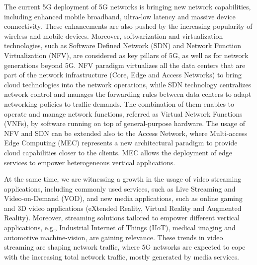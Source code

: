 




\begin{abstracts}        %
The current 5G deployment of 5G networks is bringing new network capabilities, including enhanced mobile broadband, ultra-low latency and massive device connectivity. These enhancements are also pushed by the increasing popularity of wireless and mobile devices. Moreover, softwarization and virtualization technologies, such as Software Defined Network (SDN) and Network Function Virtualization (NFV), are considered as key pillars of 5G, as well as for network generations beyond 5G.
NFV paradigm virtualizes all the data centers that are part of the network infrastructure (Core, Edge and Access Networks) to bring cloud technologies into the network operations,
while SDN technology centralizes network control and manages the forwarding rules between data centers to adapt networking policies to traffic demands.
The combination of them enables to operate and manage network functions, referred as Virtual Network Functions (VNFs), by software running on top of general-purpose hardware. The usage of NFV and SDN can be extended also to the Access Network, where Multi-access Edge Computing (MEC) represents a new architectural paradigm to provide cloud capabilities closer to the clients. MEC allows the deployment of edge services to empower heterogeneous vertical applications.

At the same time, we are witnessing a growth in the usage of video streaming applications, including commonly used services, such as Live Streaming and Video-on-Demand (VOD), and new media applications, such as online gaming and 3D video applications (eXtended Reality, Virtual Reality and Augmented Reality). Moreover, streaming solutions tailored to empower different vertical applications, e.g., Industrial Internet of Things (IIoT), medical imaging and automotive machine-vision, are gaining relevance. These trends in video streaming are shaping network traffic, where 5G networks are expected to cope with the increasing total network traffic, mostly generated by media services.


\end{abstracts}
